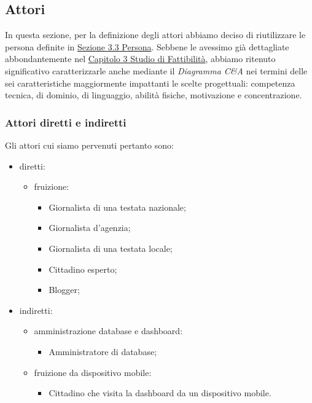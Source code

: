 \subsection{Attori}
\label{ss:attori}
In questa sezione, per la definizione degli attori abbiamo deciso di riutilizzare le persona definite in \hyperref[s:persona]{Sezione 3.3 Persona}.
Sebbene le avessimo già dettagliate abbondantemente nel \hyperref[c:studio-fattibilita]{Capitolo 3 Studio di Fattibilità}, abbiamo ritenuto significativo caratterizzarle anche mediante il \textit{Diagramma C\&A} nei termini delle sei caratteristiche maggiormente impattanti le scelte progettuali: competenza tecnica, di dominio, di linguaggio, abilità fisiche, motivazione e concentrazione.

\noindent
\subsubsection{Attori diretti e indiretti}
\label{sss:attori-diretti-indiretti}
Gli attori cui siamo pervenuti pertanto sono:
\begin{itemize}
    \item diretti:
    \begin{itemize}
        \item fruizione:
        \begin{itemize}
            \item Giornalista di una testata nazionale;
            \item Giornalista d'agenzia;
            \item Giornalista di una testata locale;
            \item Cittadino esperto;
            \item Blogger;
        \end{itemize}
    \end{itemize}
    \item indiretti:
    \begin{itemize}
        \item amministrazione database e dashboard:
        \begin{itemize}
            \item Amministratore di database;
        \end{itemize}
        \item fruizione da dispositivo mobile:
        \begin{itemize}
            \item Cittadino che visita la dashboard da un dispositivo mobile.
        \end{itemize}
    \end{itemize}
\end{itemize}

